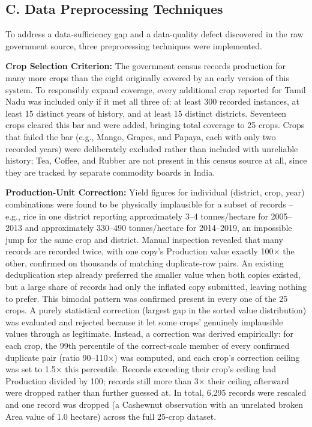 \documentclass[12pt,a4paper,twocolumn]{article}
\begin{document}
\subsection*{C. Data Preprocessing Techniques}

To address a data-sufficiency gap and a data-quality defect discovered in the raw
government source, three preprocessing techniques were implemented.

\textbf{Crop Selection Criterion:} The government census records production for many
more crops than the eight originally covered by an early version of this system. To
responsibly expand coverage, every additional crop reported for Tamil Nadu was
included only if it met all three of: at least 300 recorded instances, at least 15
distinct years of history, and at least 15 distinct districts. Seventeen crops
cleared this bar and were added, bringing total coverage to 25 crops. Crops that
failed the bar (e.g., Mango, Grapes, and Papaya, each with only two recorded years)
were deliberately excluded rather than included with unreliable history; Tea, Coffee,
and Rubber are not present in this census source at all, since they are tracked by
separate commodity boards in India.

\textbf{Production-Unit Correction:} Yield figures for individual (district, crop,
year) combinations were found to be physically implausible for a subset of records --
e.g., rice in one district reporting approximately 3--4 tonnes/hectare for
2005--2013 and approximately 330--490 tonnes/hectare for 2014--2019, an impossible
jump for the same crop and district. Manual inspection revealed that many records are
recorded twice, with one copy's Production value exactly 100$\times$ the other,
confirmed on thousands of matching duplicate-row pairs. An existing deduplication
step already preferred the smaller value when both copies existed, but a large share
of records had only the inflated copy submitted, leaving nothing to prefer. This
bimodal pattern was confirmed present in every one of the 25 crops. A purely
statistical correction (largest gap in the sorted value distribution) was evaluated
and rejected because it let some crops' genuinely implausible values through as
legitimate. Instead, a correction was derived empirically: for each crop, the 99th
percentile of the correct-scale member of every confirmed duplicate pair (ratio
90--110$\times$) was computed, and each crop's correction ceiling was set to
1.5$\times$ this percentile. Records exceeding their crop's ceiling had Production
divided by 100; records still more than 3$\times$ their ceiling afterward were
dropped rather than further guessed at. In total, 6,295 records were rescaled and one
record was dropped (a Cashewnut observation with an unrelated broken Area value of
1.0 hectare) across the full 25-crop dataset.
\end{document}
